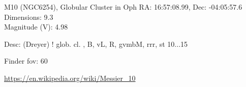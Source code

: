 \begin{block}{M10 (NGC6254), Globular Cluster in Oph}
    RA: 16:57:08.99, Dec: -04:05:57.6 \\ 
    Dimensions: 9.3 \\ 
    Magnitude (V): 4.98


    Desc: (Dreyer) ! glob. cl. , B, vL, R, gvmbM, rrr, st 10...15 

    Finder fov: 60 

    \url{https://en.wikipedia.org/wiki/Messier_10} 
\end{block}